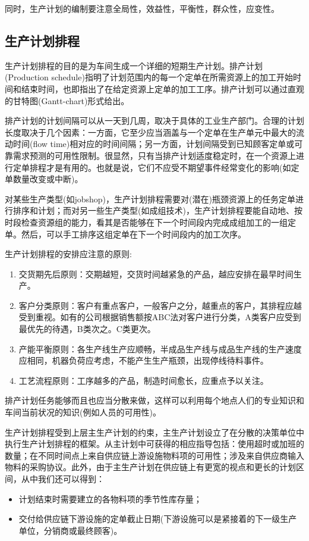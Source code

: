     同时，生产计划的编制要注意全局性，效益性，平衡性，群众性，应变性。

\subsection {生产计划排程}

    生产计划排程的目的是为车间生成一个详细的短期生产计划。排产计划(Production schedule)指明了计划范围内的每一个定单在所需资源上的加工开始时间和结束时间，也即指出了在给定资源上定单的加工工序。排产计划可以通过直观的甘特图(Gantt-chart)形式给出。

    排产计划的计划间隔可以从一天到几周，取决于具体的工业生产部门。合理的计划长度取决于几个因素：一方面，它至少应当涵盖与一个定单在生产单元中最大的流动时间(flow time)相对应的时间间隔；另一方面，计划间隔受到已知顾客定单或可靠需求预测的可用性限制。很显然，只有当排产计划适度稳定时，在一个资源上进行定单排程才是有用的。也就是说，它们不应受不期望事件经常变化的影响(如定单数量改变或中断)。

    对某些生产类型(如jobshop)，生产计划排程需要对(潜在)瓶颈资源上的任务定单进行排序和计划；而对另一些生产类型(如成组技术)，生产计划排程要能自动地、按时段检查资源组的能力，看其是否能够在下一个时间段内完成成组加工的一组定单。然后，可以手工排序这组定单在下一个时间段内的加工次序。

    生产计划排程的安排应注意的原则:
    \begin{enumerate}
        \item  交货期先后原则：交期越短，交货时间越紧急的产品，越应安排在最早时间生产。
        \item  客户分类原则：客户有重点客户，一般客户之分，越重点的客户，其排程应越受到重视。如有的公司根据销售额按ABC法对客户进行分类，A类客户应受到最优先的待遇，B类次之。C类更次。
        \item  产能平衡原则：各生产线生产应顺畅，半成品生产线与成品生产线的生产速度应相同，机器负荷应考虑，不能产生生产瓶颈，出现停线待料事件。
        \item  工艺流程原则：工序越多的产品，制造时间愈长，应重点予以关注。
    \end{enumerate}

    排产计划任务能够而且也应当分散来做，这样可以利用每个地点人们的专业知识和车间当前状况的知识(例如人员的可用性)。

    生产计划排程受到上层主生产计划的约束，主生产计划设立了在分散的决策单位中执行生产计划排程的框架。从主计划中可获得的相应指导包括：使用超时或加班的数量；在不同时间点上来自供应链上游设施物料项的可用性；涉及来自供应商输入物料的采购协议。此外，由于主生产计划在供应链上有更宽的视点和更长的计划区间，从中我们还可以得到：
    \begin{itemize}
        \item  计划结束时需要建立的各物料项的季节性库存量；
        \item  交付给供应链下游设施的定单截止日期(下游设施可以是紧接着的下一级生产单位，分销商或最终顾客)。
    \end{itemize}

